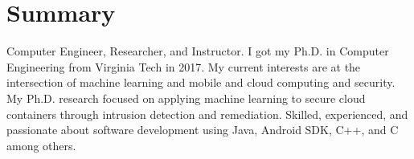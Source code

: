 \section{Summary}
Computer Engineer, Researcher, and Instructor. I got my Ph.D. in Computer Engineering from Virginia Tech in 2017. 
My current interests are at the intersection of machine learning and mobile and cloud computing and security. 
My Ph.D. research focused on applying machine learning to secure cloud containers through intrusion detection and remediation. 
Skilled, experienced, and passionate about software development using Java, Android SDK, C++, and C among others.
